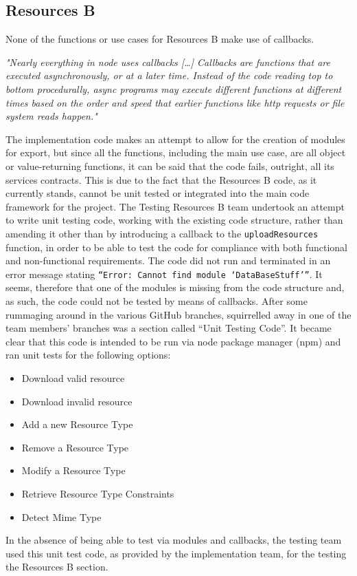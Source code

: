 \documentclass[a4paper]{article}
\begin{document}
\subsection {Resources B}
None of the functions or use cases for Resources B make use of callbacks.

\textit{ "Nearly everything in node uses callbacks […] Callbacks are functions that are executed asynchronously, or at a later time. Instead of the code reading top to bottom procedurally, async programs may execute different functions at different times based on the order and speed that earlier functions like http requests or file system reads happen."}



The implementation code makes an attempt to allow for the creation of modules for export, but since all the functions, including the main use case, are all object or value-returning functions, it can be said that the code fails, outright, all its services contracts. This is due to the fact that the Resources B code, as it currently stands, cannot be unit tested or integrated into the main code framework for the project. 
The Testing Resources B team undertook an attempt to write unit testing code, working with the existing code structure, rather than amending it other than by introducing a callback to the \texttt{uploadResources} function, in order to be able to test the code for compliance with both functional and non-functional requirements. The code did not run and terminated in an error message stating \texttt{“Error: Cannot find module ‘DataBaseStuff’”}. It seems, therefore that one of the modules is missing from the code structure and, as such, the code could not be tested by means of callbacks.
After some rummaging around in the various GitHub branches, squirrelled away in one of the team members’ branches was a section called “Unit Testing Code”. It became clear that this code is intended to be run via node package manager (npm) and ran unit tests for the following options: 
\begin{itemize}
\item	Download valid resource
\item	Download invalid resource
\item	Add a new Resource Type
\item	Remove a Resource Type
\item	Modify a Resource Type
\item	Retrieve Resource Type Constraints
\item	Detect Mime Type
\end{itemize}
In the absence of being able to test via modules and callbacks, the testing team used this unit test code, as provided by the implementation team, for the testing the Resources B section.
\end{document}
